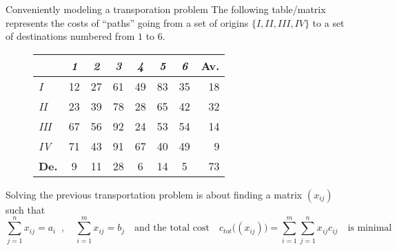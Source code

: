 \documentclass[32pt,aspectratio=169]{beamer}
\begin{document}
\begin{frame}{Conveniently modeling a transporation problem}
  The following table/matrix represents the costs of ``paths'' going
  from a set of origins $\{I, II, III, IV\}$ to a set of destinations
  numbered from $1$ to $6$. 
  \begin{figure}
    \begin{tabular}{l|c|c|c|c|c|c|r}
      & \textit{1} & \textit{2} & \textit{3} & \textit{4} & \textit{5} & \textit{6} & \cellcolor{blue!50}\textbf{Av.}\\
      \hline
      \textit{I} & \cellcolor{blue!25}12 & \cellcolor{blue!25}27 & \cellcolor{blue!25}61 & \cellcolor{blue!25}49 & \cellcolor{blue!25}83 & \cellcolor{blue!25}35 & \cellcolor{blue!50}18  \\
      \hline 
      \textit{II} & \cellcolor{blue!25}23 & \cellcolor{blue!25}39 & \cellcolor{blue!25}78 & \cellcolor{blue!25}28 & \cellcolor{blue!25}65 & \cellcolor{blue!25}42 & \cellcolor{blue!50}32  \\
      \hline
      \textit{III} & \cellcolor{blue!25}67 & \cellcolor{blue!25}56 & \cellcolor{blue!25}92 & \cellcolor{blue!25}24 & \cellcolor{blue!25}53 & \cellcolor{blue!25}54 & \cellcolor{blue!50}14  \\
      \hline
      \textit{IV} & \cellcolor{blue!25}71 & \cellcolor{blue!25}43 & \cellcolor{blue!25}91 & \cellcolor{blue!25}67 & \cellcolor{blue!25}40 & \cellcolor{blue!25}49 & \cellcolor{blue!50}9 \\
      \hline 
      \cellcolor{blue!50}\textbf{De.} & \cellcolor{blue!50}9 & \cellcolor{blue!50}11 & \cellcolor{blue!50}28 & \cellcolor{blue!50}6 & \cellcolor{blue!50}14 & \cellcolor{blue!50}5 & \cellcolor{blue!60}73 \\
  \end{tabular}
\end{figure}
Solving the previous transportation problem is about finding a
matrix $(x_{ij})$ such that
\begin{displaymath}
  \sum_{j=1}^n x_{ij} = a_i\;\; , \quad \sum_{i=1}^m x_{ij} = b_j \quad \text{and the total cost} \quad
  c_{tot}\big((x_{ij})\big) = \sum_{i=1}^m\sum_{j=1}^n x_{ij} c_{ij} \quad \text{is minimal}
\end{displaymath}
\end{frame}
\end{document}
